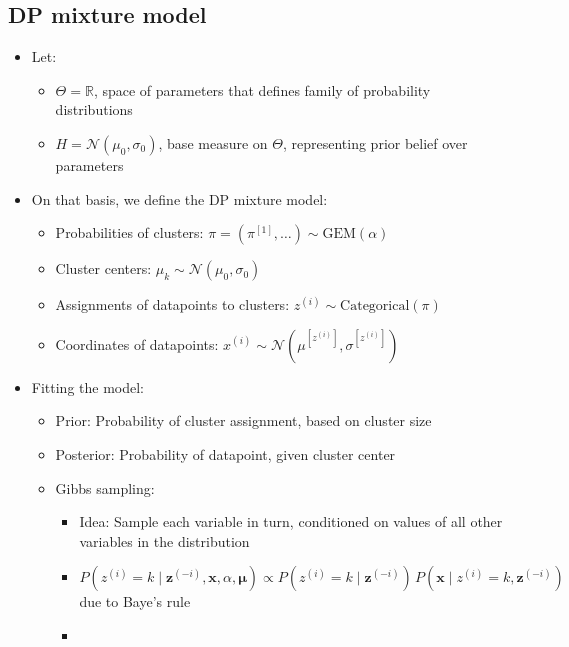 \subsection*{DP mixture model}
\begin{itemize}
    \item Let:
    \begin{itemize}
        \item $\Theta = \mathbb{R}$, space of parameters that defines family of probability distributions
        \item $H = \mathcal{N}(\mu_0, \sigma_0)$, base measure on $\Theta$, representing prior belief over parameters
    \end{itemize}
    \item On that basis, we define the DP mixture model:
    \begin{itemize}
        \item Probabilities of clusters:
        $
        \pi = (\pi^{[1]}, \dots) \sim \textrm{GEM}(\alpha)
        $
        \item Cluster centers:
        $
        \mu_k \sim \mathcal{N}(\mu_0, \sigma_0)
        $
        \item Assignments of datapoints to clusters:
        $
        z^{(i)} \sim \textrm{Categorical}(\pi)
        $
        \item Coordinates of datapoints:
        $
        x^{(i)} \sim \mathcal{N}(\mu^{[z^{(i)}]}, \sigma^{[z^{(i)}]})
        $
    \end{itemize}
    \item Fitting the model:
    \begin{itemize}
        \item Prior: Probability of cluster assignment, based on cluster size
        \item Posterior: Probability of datapoint, given cluster center
        \item Gibbs sampling:
        \begin{itemize}
            \item Idea: Sample each variable in turn, conditioned on values of all other variables in the distribution
            \item 
            $
            P(z^{(i)} = k \mid \boldsymbol{z}^{(-i)}, \boldsymbol{x}, \alpha, \boldsymbol{\mu}) 
            \propto P(z^{(i)} = k \mid \boldsymbol{z}^{(-i)}) \, P(\boldsymbol{x} \mid z^{(i)} = k, \boldsymbol{z}^{(-i)})
            $ due to Baye's rule
            \item 

\end{itemize}
\end{itemize}
\end{itemize}
